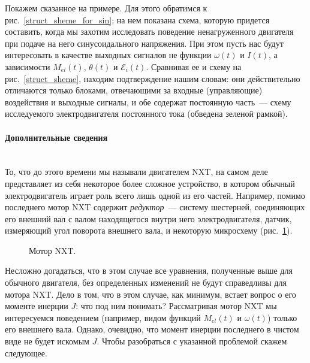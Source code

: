 \documentclass[12pt, a4paper, openany]{extarticle}
\begin{document}
Покажем сказанное на примере.
Для этого обратимся к рис.~\ref{struct_sheme_for_sin}; на нем показана схема, которую придется составить, когда мы захотим исследовать поведение ненагруженного двигателя при подаче на него синусоидального напряжения.
При этом пусть нас будут интересовать в качестве выходных сигналов не функции $\omega(t)$ и $I(t)$, а зависимости $M_{el}(t)$, $\theta(t)$ и $\mathcal E_i(t)$.
Сравнивая ее и схему на рис.~\ref{struct_sheme}, находим подтверждение нашим словам: они действительно отличаются только блоками, отвечающими за входные (управляющие) воздействия и выходные сигналы, и обе содержат постоянную часть~--- схему исследуемого электродвигателя постоянного тока (обведена зеленой рамкой).

\paragraph*{Дополнительные сведения}$\phantom{-}$\\
\hspace*{\parindent}То, что до этого времени мы называли двигателем NXT, на самом деле представляет из себя некоторое более сложное устройство, в котором обычный электродвигатель играет роль всего лишь одной из его частей.
Например, помимо последнего мотор NXT содержит \textit{редуктор}~--- систему шестерней, соединяющих его внешний вал с валом находящегося внутри него электродвигателя, датчик, измеряющий угол поворота внешнего вала, и некоторую микросхему (рис.~\ref{motor_inside}).

\begin{figure}[h]
	\caption{Мотор NXT.}
	\label{motor_inside}
\end{figure}

Несложно догадаться, что в этом случае все уравнения, полученные выше для обычного двигателя, без определенных изменений не будут справедливы для мотора NXT.
Дело в том, что в этом случае, как минимум, встает вопрос о его моменте инерции $J$: что под ним понимать?
Рассматривая мотор NXT мы интересуемся поведением (например, видом функций $M_{el}(t)$ и $\omega(t)$) только его внешнего вала.
Однако, очевидно, что момент инерции последнего в чистом виде не будет искомым $J$.
Чтобы разобраться с указанной проблемой скажем следующее.
\end{document}
